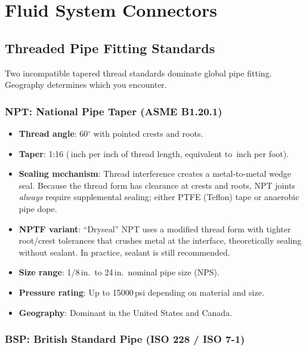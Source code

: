 \documentclass[11pt,letterpaper,twoside,openany]{book}
\providecommand{\ang}[1]{#1\ensuremath{{}^{\circ}}}
\begin{document}
\section{Fluid System Connectors}

\subsection{Threaded Pipe Fitting Standards}

Two incompatible tapered thread standards dominate global pipe fitting. Geography determines which you encounter.

\subsubsection{NPT: National Pipe Taper (ASME B1.20.1)}

\begin{itemize}[leftmargin=1.5em]
  \item \textbf{Thread angle}: \ang{60} with pointed crests and roots.
  \item \textbf{Taper}: 1:16 (\textonequarter\,inch per inch of thread length, equivalent to \textthreequarters\,inch per foot).
  \item \textbf{Sealing mechanism}: Thread interference creates a metal-to-metal wedge seal. Because the thread form has clearance at crests and roots, NPT joints \emph{always} require supplemental sealing; either PTFE (Teflon) tape or anaerobic pipe dope.
  \item \textbf{NPTF variant}: ``Dryseal'' NPT uses a modified thread form with tighter root/crest tolerances that crushes metal at the interface, theoretically sealing without sealant. In practice, sealant is still recommended.
  \item \textbf{Size range}: 1/8\,in.\ to 24\,in.\ nominal pipe size (NPS).
  \item \textbf{Pressure rating}: Up to 15000\,psi depending on material and size.
  \item \textbf{Geography}: Dominant in the United States and Canada.
\end{itemize}

\subsubsection{BSP: British Standard Pipe (ISO 228 / ISO 7-1)}
\end{document}
